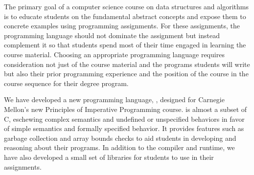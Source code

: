 The primary goal of a computer science course on data structures and algorithms
is to educate students on the fundamental abstract concepts and expose them to
concrete examples using programming assignments. For these assignments, the
programming language should not dominate the assignment but instead complement
it so that students spend most of their time engaged in learning the course
material. Choosing an appropriate programming language requires consideration
not just of the course material and the programs students will write but also
their prior programming experience and the position of the course in the course
sequence for their degree program.

We have developed a new programming language, \langname{}, designed for
Carnegie Mellon's new Principles of Imperative Programming course. \langname{}
is almost a subset of C, eschewing complex semantics and undefined or
unspecified behaviors in favor of simple semantics and formally specified
behavior. It provides features such as garbage collection and array bounds
checks to aid students in developing and reasoning about their programs. In
addition to the compiler and runtime, we have also developed a small set of
libraries for students to use in their assignments.

